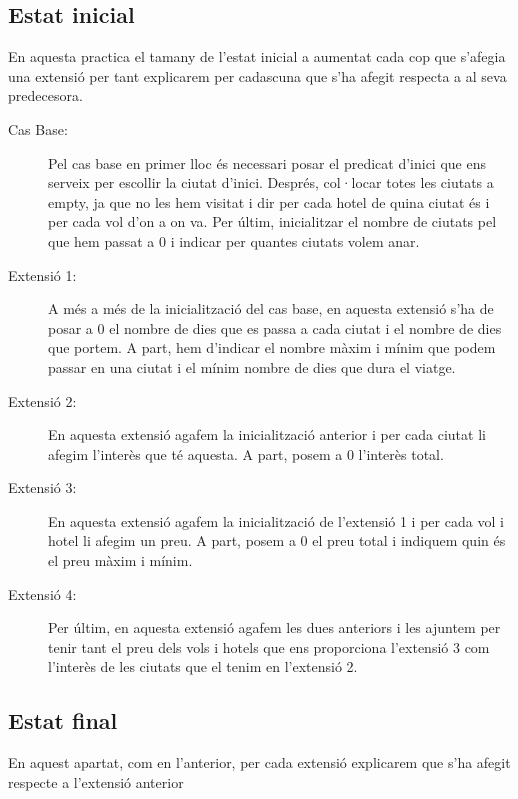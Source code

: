 \documentclass[11pt,a4paper]{article}
\begin{document}
\subsection{Estat inicial}
En aquesta practica el tamany de l'estat inicial a aumentat cada cop que s'afegia una extensió per tant explicarem per cadascuna que s'ha afegit respecta a al seva predecesora.
\begin{description}
\item[Cas Base:] Pel cas base en primer lloc és necessari posar el predicat d'inici que ens serveix per escollir la ciutat d'inici. Després, col·locar totes les ciutats a empty, ja que no les hem visitat i dir per cada hotel de quina ciutat és i per cada vol d'on a on va.
Per últim, inicialitzar el nombre de ciutats pel que hem passat a 0 i indicar per quantes ciutats volem anar.
\item[Extensió 1:] A més a més de la inicialització del cas base, en aquesta extensió s'ha de posar a 0 el nombre de dies que es passa a cada ciutat i el nombre de dies que portem. A part, hem d'indicar el nombre màxim i mínim que podem passar en una ciutat i el mínim nombre de dies que dura el viatge.

\item[Extensió 2:] En aquesta extensió agafem la inicialització anterior i per cada ciutat li afegim l'interès que té aquesta. A part, posem a 0 l'interès total.
\item[Extensió 3:] En aquesta extensió agafem la inicialització de l'extensió 1 i per cada vol i hotel li afegim un preu. A part, posem a 0 el preu total i indiquem quin és el preu màxim i mínim.
\item[Extensió 4:] Per últim, en aquesta extensió agafem les dues anteriors i les ajuntem per tenir tant el preu dels vols i hotels que ens proporciona l'extensió 3 com l'interès de les ciutats que el tenim en l'extensió 2.
\end{description}


\subsection{Estat final}
En aquest apartat, com en l'anterior, per cada extensió explicarem que s'ha afegit respecte a l'extensió anterior
\end{document}
